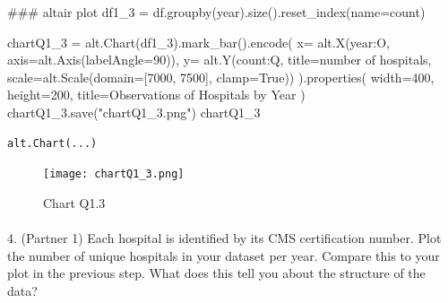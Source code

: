 \documentclass[
  letterpaper,
  DIV=11,
  numbers=noendperiod]{scrartcl}
\makeatletter
\let\oldparagraph\paragraph
\renewcommand{\paragraph}{
    \@ifstar
      \xxxParagraphStar
      \xxxParagraphNoStar
  }
\newcommand{\xxxParagraphStar}[1]{\oldparagraph*{#1}\mbox{}}
\newcommand{\xxxParagraphNoStar}[1]{\oldparagraph{#1}\mbox{}}
\newenvironment{Shaded}{\begin{snugshade}}{\end{snugshade}}
\newcommand{\CommentTok}[1]{\textcolor[rgb]{0.37,0.37,0.37}{#1}}
\newcommand{\DecValTok}[1]{\textcolor[rgb]{0.68,0.00,0.00}{#1}}
\newcommand{\NormalTok}[1]{\textcolor[rgb]{0.00,0.23,0.31}{#1}}
\newcommand{\OperatorTok}[1]{\textcolor[rgb]{0.37,0.37,0.37}{#1}}
\newcommand{\StringTok}[1]{\textcolor[rgb]{0.13,0.47,0.30}{#1}}
\newcommand{\VariableTok}[1]{\textcolor[rgb]{0.07,0.07,0.07}{#1}}
\makeatother
\begin{document}
\begin{Shaded}
\begin{Highlighting}[]
\CommentTok{\#\#\# altair plot}
\NormalTok{df1\_3 }\OperatorTok{=}\NormalTok{ df.groupby(}\StringTok{\textquotesingle{}year\textquotesingle{}}\NormalTok{).size().reset\_index(name}\OperatorTok{=}\StringTok{\textquotesingle{}count\textquotesingle{}}\NormalTok{)}

\NormalTok{chartQ1\_3 }\OperatorTok{=}\NormalTok{ alt.Chart(df1\_3).mark\_bar().encode(}
\NormalTok{    x}\OperatorTok{=}\NormalTok{ alt.X(}\StringTok{\textquotesingle{}year:O\textquotesingle{}}\NormalTok{, axis}\OperatorTok{=}\NormalTok{alt.Axis(labelAngle}\OperatorTok{=}\DecValTok{90}\NormalTok{)),}
\NormalTok{    y}\OperatorTok{=}\NormalTok{ alt.Y(}\StringTok{\textquotesingle{}count:Q\textquotesingle{}}\NormalTok{, title}\OperatorTok{=}\StringTok{\textquotesingle{}number of hospitals\textquotesingle{}}\NormalTok{, scale}\OperatorTok{=}\NormalTok{alt.Scale(domain}\OperatorTok{=}\NormalTok{[}\DecValTok{7000}\NormalTok{, }\DecValTok{7500}\NormalTok{], clamp}\OperatorTok{=}\VariableTok{True}\NormalTok{))}
\NormalTok{).properties(}
\NormalTok{    width}\OperatorTok{=}\DecValTok{400}\NormalTok{, }
\NormalTok{    height}\OperatorTok{=}\DecValTok{200}\NormalTok{, }
\NormalTok{    title}\OperatorTok{=}\StringTok{\textquotesingle{}Observations of Hospitals by Year\textquotesingle{}}  
\NormalTok{)}
\NormalTok{chartQ1\_3.save(}\StringTok{"chartQ1\_3.png"}\NormalTok{)}
\NormalTok{chartQ1\_3}
\end{Highlighting}
\end{Shaded}

\begin{verbatim}
alt.Chart(...)
\end{verbatim}

\begin{figure}[H]

{\centering \texttt{[image: chartQ1\_3.png]}

}

\caption{Chart Q1.3}

\end{figure}%

\paragraph{4. (Partner 1) Each hospital is identified by its CMS
certification number. Plot the number of unique hospitals in your
dataset per year. Compare this to your plot in the previous step. What
does this tell you about the structure of the
data?}\label{partner-1-each-hospital-is-identified-by-its-cms-certification-number.-plot-the-number-of-unique-hospitals-in-your-dataset-per-year.-compare-this-to-your-plot-in-the-previous-step.-what-does-this-tell-you-about-the-structure-of-the-data}
\end{document}
